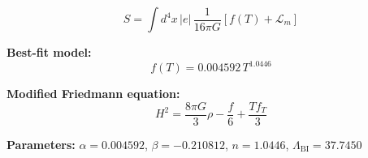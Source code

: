 
\begin{equation}
  S = \int d^4x \, |e| \, \frac{1}{16\pi G} \left[ f(T) + \mathcal{L}_m \right]
\end{equation}

\textbf{Best-fit model:}
\begin{equation}
  f(T) = 0.004592 \, T^{1.0446}
\end{equation}

\textbf{Modified Friedmann equation:}
\begin{equation}
  H^2 = \frac{8\pi G}{3} \rho - \frac{f}{6} + \frac{T f_T}{3}
\end{equation}

\textbf{Parameters:}
$\alpha = 0.004592$, \quad
$\beta = -0.210812$, \quad
$n = 1.0446$, \quad
$\Lambda_{\text{BI}} = 37.7450$